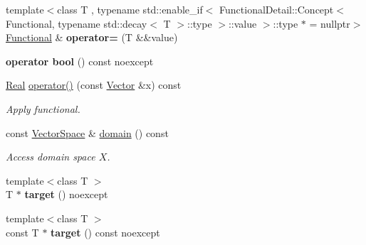 \begin{DoxyCompactItemize}
\item 
\hypertarget{classSpacy_1_1Functional_a90fe7e1ba7e375f6bb8875b9e927a8d7}{{\footnotesize template$<$class T , typename std\-::enable\-\_\-if$<$ Functional\-Detail\-::\-Concept$<$ Functional, typename std\-::decay$<$ T $>$\-::type $>$\-::value $>$\-::type $\ast$  = nullptr$>$ }\\\hyperlink{classSpacy_1_1Functional}{\-Functional} \& {\bfseries operator=} (\-T \&\&value)}\label{classSpacy_1_1Functional_a90fe7e1ba7e375f6bb8875b9e927a8d7}

\item 
\hypertarget{classSpacy_1_1Functional_a9389924b8e141796b02879a26f37d7b0}{{\bfseries operator bool} () const noexcept}\label{classSpacy_1_1Functional_a9389924b8e141796b02879a26f37d7b0}

\item 
\hypertarget{classSpacy_1_1Functional_af51f903133f2fbf92cf12f790e429919}{\hyperlink{classSpacy_1_1Real}{\-Real} \hyperlink{classSpacy_1_1Functional_af51f903133f2fbf92cf12f790e429919}{operator()} (const \hyperlink{classSpacy_1_1Vector}{\-Vector} \&x) const }\label{classSpacy_1_1Functional_af51f903133f2fbf92cf12f790e429919}

\begin{DoxyCompactList}\small\item\em \-Apply functional. \end{DoxyCompactList}\item 
\hypertarget{classSpacy_1_1Functional_a6f4ada552c025579bcce852316a071be}{const \hyperlink{classSpacy_1_1VectorSpace}{\-Vector\-Space} \& \hyperlink{classSpacy_1_1Functional_a6f4ada552c025579bcce852316a071be}{domain} () const }\label{classSpacy_1_1Functional_a6f4ada552c025579bcce852316a071be}

\begin{DoxyCompactList}\small\item\em \-Access domain space $X$. \end{DoxyCompactList}\item 
\hypertarget{classSpacy_1_1Functional_a198a232d6aebbc15f7ab330b8294c8b4}{{\footnotesize template$<$class T $>$ }\\\-T $\ast$ {\bfseries target} () noexcept}\label{classSpacy_1_1Functional_a198a232d6aebbc15f7ab330b8294c8b4}

\item 
\hypertarget{classSpacy_1_1Functional_ab11a7ac418f216df78ff928893e10345}{{\footnotesize template$<$class T $>$ }\\const \-T $\ast$ {\bfseries target} () const noexcept}\label{classSpacy_1_1Functional_ab11a7ac418f216df78ff928893e10345}

\end{DoxyCompactItemize}



